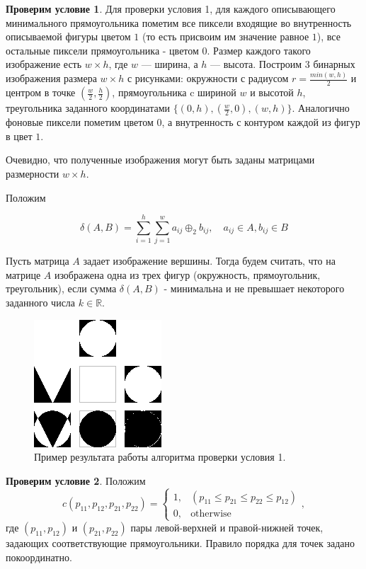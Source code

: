\documentclass[makeidx, a4paper, 14pt]{extarticle}
\newcommand{\R}{\mathbb{R}}
\begin{document}
\textbf{Проверим условие 1}.
Для проверки условия 1, для каждого описывающего минимального прямоугольника пометим все пиксели входящие во внутренность описываемой фигуры цветом $1$ (то есть присвоим им значение равное $1$),
все остальные пиксели прямоугольника - цветом $0$. Размер каждого такого изображение есть ${w \times h}$, где $w$ --- ширина, а $h$ --- высота.
Построим 3 бинарных изображения размера $w \times h$ с рисунками: окружности с радиусом ${r = \frac{min(w, h)}{2}}$ и центром в точке ${(\frac{w}{2}, \frac{h}{2})}$, прямоугольника c шириной $w$ и высотой $h$,
треугольника заданного координатами ${\{(0, h), (\frac{w}{2}, 0), (w, h)\}}$. Аналогично фоновые пиксели пометим цветом $0$, а внутренность с контуром каждой из фигур в цвет $1$.

Очевидно, что полученные изображения могут быть заданы матрицами размерности ${w \times h}$.

Положим

\[
    \delta(A, B) = \sum_{i=1}^{h}\sum_{j=1}^{w} a_{ij} \oplus_2 b_{ij}, \quad a_{ij} \in A, b_{ij} \in B
\]

Пусть матрица $A$ задает изображение вершины. Тогда будем считать, что на матрице $A$ изображена одна из трех фигур (окружность, прямоугольник, треугольник),
если сумма $\delta(A, B)$ - минимальна и не превышает некоторого заданного числа $k \in \R$.

\begin{figure}[H]
    \centering
    \includegraphics[scale=4]{shape_diff.png}
    \caption{Пример результата работы алгоритма проверки условия 1.}
\end{figure}

\textbf{Проверим условие 2}.
Положим \[
    c(p_{11}, p_{12}, p_{21}, p_{22}) = \begin{cases}
        1, &(p_{11} \le p_{21} \le p_{22} \le p_{12}) \\
        0, &\textrm{otherwise}
    \end{cases},
\]
где ${(p_{11}, p_{12})}$ и ${(p_{21}, p_{22})}$ пары левой-верхней и правой-нижней точек, задающих соответствующие прямоугольники.
Правило порядка для точек задано покоординатно.
\end{document}
